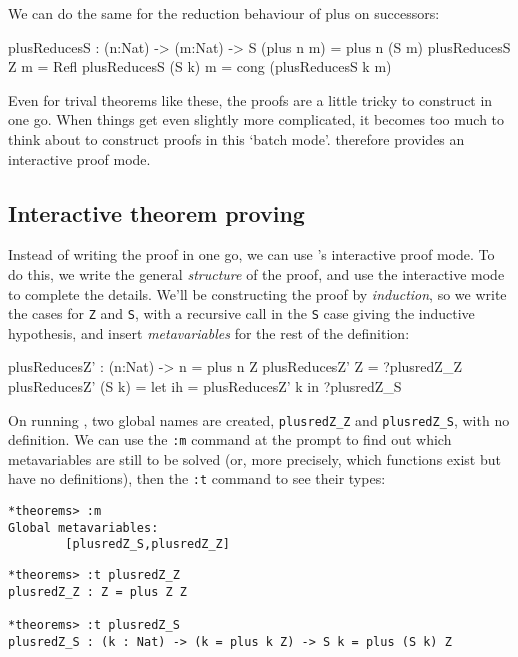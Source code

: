 \noindent
We can do the same for the reduction behaviour of plus on successors:

\begin{code}
plusReducesS : (n:Nat) -> (m:Nat) -> S (plus n m) = plus n (S m)
plusReducesS Z m = Refl
plusReducesS (S k) m = cong (plusReducesS k m)
\end{code}

\noindent
Even for trival theorems like these, the proofs are a little tricky to construct in one go.
When things get even slightly more complicated, it becomes too much to think about to construct proofs in this `batch mode'.
\Idris{} therefore provides an interactive proof mode.

\subsection{Interactive theorem proving}

Instead of writing the proof in one go, we can use \Idris{}'s interactive proof mode. To do this, we write the general \emph{structure} of the proof, and use the interactive mode to complete the details.
We'll be constructing the proof by \emph{induction}, so we write the cases for \texttt{Z} and \texttt{S}, with a recursive call in the \texttt{S} case giving the inductive hypothesis, and insert \emph{metavariables} for the rest of the definition:

\begin{code}
plusReducesZ' : (n:Nat) -> n = plus n Z
plusReducesZ' Z     = ?plusredZ_Z
plusReducesZ' (S k) = let ih = plusReducesZ' k in
                      ?plusredZ_S
\end{code}

\noindent
On running \Idris{}, two global names are created, \texttt{plusredZ\_Z} and \texttt{plusredZ\_S}, with no definition.
We can use the \texttt{:m} command at the prompt to find out which metavariables are still to be solved (or, more precisely, which functions exist but have no definitions), then the \texttt{:t} command to see their types:

\begin{lstlisting}[style=stdout]
*theorems> :m
Global metavariables:
        [plusredZ_S,plusredZ_Z]

\end{lstlisting}

\begin{lstlisting}[style=stdout]
*theorems> :t plusredZ_Z
plusredZ_Z : Z = plus Z Z

*theorems> :t plusredZ_S
plusredZ_S : (k : Nat) -> (k = plus k Z) -> S k = plus (S k) Z
\end{lstlisting}

